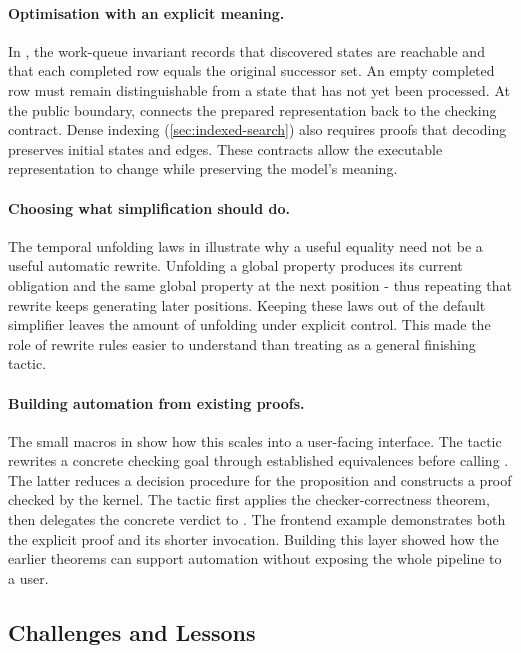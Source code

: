 \paragraph{Optimisation with an explicit meaning.}
In , the work-queue invariant records that
discovered states are reachable and that each completed row equals the
original successor set. An empty completed row must remain distinguishable
from a state that has not yet been processed. At the public boundary,
 connects the prepared representation
back to the checking contract. Dense indexing (\cref{sec:indexed-search}) also
requires proofs that decoding preserves initial states and edges. These
contracts allow the executable representation to change while preserving the
model's meaning.

\paragraph{Choosing what simplification should do.}
The temporal unfolding laws in  illustrate why a
useful equality need not be a useful automatic rewrite. Unfolding a global
property produces its current obligation and the same global property at the
next position - thus repeating that rewrite keeps generating later positions.
Keeping these laws out of the default simplifier leaves the amount of
unfolding under explicit control. This made the role of rewrite rules easier
to understand than treating  as a general finishing tactic.

\paragraph{Building automation from existing proofs.}
The small macros in  show how this scales into a
user-facing interface. The tactic  rewrites a concrete
checking goal through established equivalences before calling .
The latter reduces a decision procedure for the proposition and constructs
a proof checked by the kernel. The tactic  first applies
the checker-correctness theorem, then delegates the concrete verdict to
. The frontend example demonstrates both the explicit
proof and its shorter invocation. Building this layer showed how the earlier
theorems can support automation without exposing the whole pipeline to a user.

\subsection{Challenges and Lessons}

